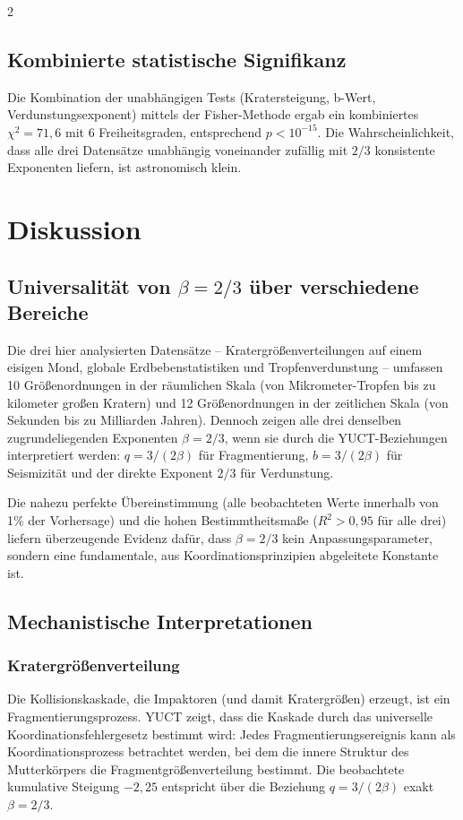 \documentclass[11pt,a4paper]{article}
\newcommand{\betaf}{\beta}
\begin{document}
\begin{multicols}{2}
		\subsection{Kombinierte statistische Signifikanz}
		
		Die Kombination der unabhängigen Tests (Kratersteigung, b-Wert, Verdunstungsexponent) mittels der Fisher-Methode ergab ein kombiniertes \(\chi^2 = 71,6\) mit 6 Freiheitsgraden, entsprechend \(p < 10^{-15}\). Die Wahrscheinlichkeit, dass alle drei Datensätze unabhängig voneinander zufällig mit \(2/3\) konsistente Exponenten liefern, ist astronomisch klein.
		
		\section{Diskussion}
		
		\subsection{Universalität von \(\betaf = 2/3\) über verschiedene Bereiche}
		
		Die drei hier analysierten Datensätze – Kratergrößenverteilungen auf einem eisigen Mond, globale Erdbebenstatistiken und Tropfenverdunstung – umfassen 10 Größenordnungen in der räumlichen Skala (von Mikrometer-Tropfen bis zu kilometer großen Kratern) und 12 Größenordnungen in der zeitlichen Skala (von Sekunden bis zu Milliarden Jahren). Dennoch zeigen alle drei denselben zugrundeliegenden Exponenten \(\betaf = 2/3\), wenn sie durch die YUCT-Beziehungen interpretiert werden: \(q = 3/(2\betaf)\) für Fragmentierung, \(b = 3/(2\betaf)\) für Seismizität und der direkte Exponent \(2/3\) für Verdunstung.
		
		Die nahezu perfekte Übereinstimmung (alle beobachteten Werte innerhalb von 1\% der Vorhersage) und die hohen Bestimmtheitsmaße (\(R^2 > 0,95\) für alle drei) liefern überzeugende Evidenz dafür, dass \(\betaf = 2/3\) kein Anpassungsparameter, sondern eine fundamentale, aus Koordinationsprinzipien abgeleitete Konstante ist.
		
		\subsection{Mechanistische Interpretationen}
		
		\subsubsection{Kratergrößenverteilung}
		Die Kollisionskaskade, die Impaktoren (und damit Kratergrößen) erzeugt, ist ein Fragmentierungsprozess. YUCT zeigt, dass die Kaskade durch das universelle Koordinationsfehlergesetz bestimmt wird: Jedes Fragmentierungsereignis kann als Koordinationsprozess betrachtet werden, bei dem die innere Struktur des Mutterkörpers die Fragmentgrößenverteilung bestimmt. Die beobachtete kumulative Steigung \(-2,25\) entspricht über die Beziehung \(q = 3/(2\betaf)\) exakt \(\betaf = 2/3\).
		

\end{multicols}
\end{document}
